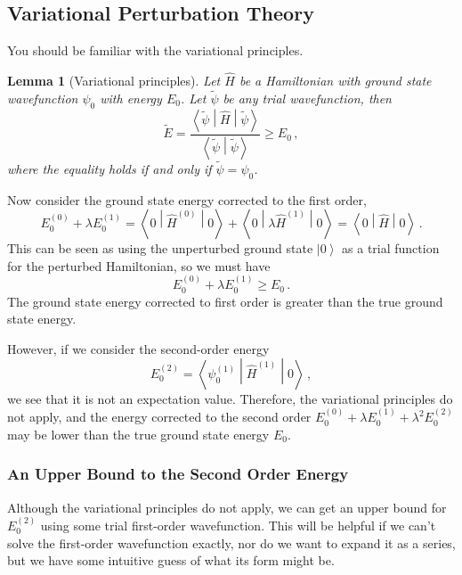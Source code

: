 \documentclass{article}
\theoremstyle{plain}\theoremheaderfont{\normalfont\itshape}\theorembodyfont{\rmfamily}\theoremseparator{.}\newtheorem*{rem}{Remark}\newtheorem*{ex}{Example}\newtheorem*{proof}{Proof}\newtheorem*{altp}{Alternative proof}
\theoremstyle{plain}\theoremheaderfont{\normalfont\bfseries}\theorembodyfont{\rmfamily}\theoremseparator{.}\newtheorem{thm}{Theorem}[section]\newtheorem{lem}[thm]{Lemma}\newtheorem{prop}[thm]{Proposition}\newtheorem*{cor}{Corollary}\newtheorem{defn}[thm]{Definition}\newtheorem{clm}[thm]{Claim}\newtheorem{clminproof}{Claim}
\theoremstyle{break}\theoremheaderfont{\normalfont\itshape}\theorembodyfont{\rmfamily}\theoremseparator{.\medskip}\newtheorem*{proofskip}{Proof}\newtheorem*{exs}{Examples}\newtheorem*{rems}{Remarks}
\theoremstyle{break}\theoremheaderfont{\normalfont\bfseries}\theorembodyfont{\rmfamily}\theoremseparator{.\medskip}\newtheorem{lemskip}[thm]{Lemma}\newtheorem{defnskip}[thm]{Definition}\newtheorem{propskip}[thm]{Proposition}\newtheorem{thmskip}[thm]{Theorem}
\numberwithin{equation}{section}
\newcommand{\ket}[1]{\left| #1 \right\rangle}
\newcommand{\braket}[2]{\left\langle #1 \middle| #2 \right\rangle}
\newcommand{\mel}[3]{\left\langle #1 \middle| #2 \middle| #3 \right\rangle}
\begin{document}
    \subsection{Variational Perturbation Theory}\label{Chap:Variational_Perturbation}
    You should be familiar with the variational principles.
    \begin{lem}[Variational principles]
        Let \(\hat{H}\) be a Hamiltonian with ground state wavefunction \(\psi_0\) with energy \(E_0\). Let \(\tilde{\psi}\) be any trial wavefunction, then
        \begin{equation}
            \tilde{E}=\frac{\mel{\tilde{\psi}}{\hat{H}}{\tilde{\psi}}}{\braket{\tilde{\psi}}{\tilde{\psi}}}\ge E_0\,,
        \end{equation}
        where the equality holds if and only if \(\tilde{\psi}=\psi_0\).
    \end{lem}
    Now consider the ground state energy corrected to the first order,
    \begin{equation}
        E_0^{(0)}+\lambda E_0^{(1)}=\mel{0}{\hat{H}^{(0)}}{0}+\mel{0}{\lambda\hat{H}^{(1)}}{0}=\mel{0}{\hat{H}}{0}\,.
    \end{equation}
    This can be seen as using the unperturbed ground state \(\ket{0}\) as a trial function for the perturbed Hamiltonian, so we must have
    \begin{equation}
        E_0^{(0)}+\lambda E_0^{(1)}\ge E_0\,.
    \end{equation}
    The ground state energy corrected to first order is greater than the true ground state energy.

    However, if we consider the second-order energy
    \begin{equation}
        E_0^{(2)}=\mel{\psi_0^{(1)}}{\hat{H}^{(1)}}{0}\,,
    \end{equation}
    we see that it is not an expectation value. Therefore, the variational principles do not apply, and the energy corrected to the second order \(E_0^{(0)}+\lambda E_0^{(1)}+\lambda^2 E_0^{(2)}\) may be lower than the true ground state energy \(E_0\).

    \subsubsection{An Upper Bound to the Second Order Energy}
    Although the variational principles do not apply, we can get an upper bound for \(E_0^{(2)}\) using some trial first-order wavefunction. This will be helpful if we can't solve the first-order wavefunction exactly, nor do we want to expand it as a series, but we have some intuitive guess of what its form might be.
\end{document}
